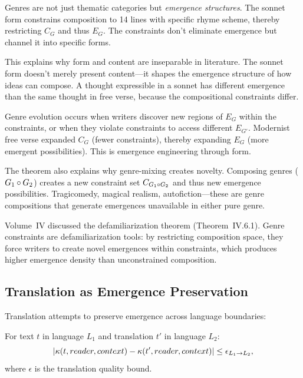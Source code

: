 \begin{interpretation}
Genres are not just thematic categories but \emph{emergence structures}. The
sonnet form constrains composition to 14 lines with specific rhyme scheme,
thereby restricting $C_G$ and thus $E_G$. The constraints don't eliminate
emergence but channel it into specific forms.

This explains why form and content are inseparable in literature. The sonnet
form doesn't merely present content---it shapes the emergence structure of how
ideas can compose. A thought expressible in a sonnet has different emergence
than the same thought in free verse, because the compositional constraints differ.

Genre evolution occurs when writers discover new regions of $E_G$ within the
constraints, or when they violate constraints to access different $E_{G'}$.
Modernist free verse expanded $C_G$ (fewer constraints), thereby expanding $E_G$
(more emergent possibilities). This is emergence engineering through form.

The theorem also explains why genre-mixing creates novelty. Composing genres
($G_1 \circ G_2$) creates a new constraint set $C_{G_1 \circ G_2}$ and
thus new emergence possibilities. Tragicomedy, magical realism, autofiction---these
are genre compositions that generate emergences unavailable in either pure genre.

Volume~IV discussed the defamiliarization theorem (Theorem~IV.6.1). Genre
constraints are defamiliarization tools: by restricting composition space, they
force writers to create novel emergences within constraints, which produces
higher emergence density than unconstrained composition.
\end{interpretation}

\subsection{Translation as Emergence Preservation}

Translation attempts to preserve emergence across language boundaries:

\begin{theorem}
\label{thm:translation-gap}
For text $t$ in language $L_1$ and translation $t'$ in language $L_2$:
\[
  |\kappa(t, reader, context) - \kappa(t', reader, context)| \leq
  \epsilon_{L_1 \to L_2},
\]
where $\epsilon$ is the translation quality bound.
\end{theorem}

